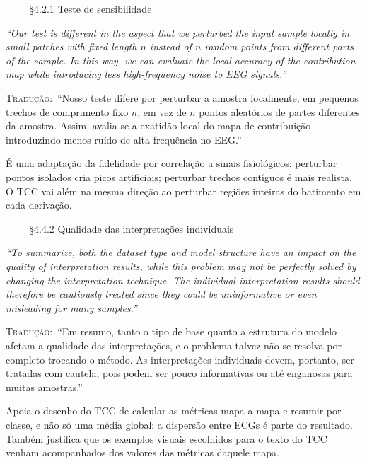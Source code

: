\documentclass[11pt,a4paper]{article}
\newcommand{\pagechip}[1]{{\setlength{\fboxsep}{1.5pt}\colorbox{cAcc}{\textcolor{white}{\scriptsize\texttt{#1}}}}}
\newenvironment{origquote}{\par\itshape\small}{\par}
\newenvironment{tradquote}{\par\small\textsc{Tradução:}\ }{\par}
\newcommand{\explab}[1]{\par\smallskip{\small\color{cAcc}\textbf{\MakeUppercase{#1}}}\par}
\begin{document}
\begin{citacard}{\pagechip{p. 5} §4.2.1 Teste de sensibilidade}
\begin{origquote}“Our test is different in the aspect that we perturbed the input sample locally in small patches with fixed length $n$ instead of $n$ random points from different parts of the sample. In this way, we can evaluate the local accuracy of the contribution map while introducing less high-frequency noise to EEG signals.”\end{origquote}
\begin{tradquote}“Nosso teste difere por perturbar a amostra localmente, em pequenos trechos de comprimento fixo $n$, em vez de $n$ pontos aleatórios de partes diferentes da amostra. Assim, avalia-se a exatidão local do mapa de contribuição introduzindo menos ruído de alta frequência no EEG.”\end{tradquote}
\explab{Explicação}
É uma adaptação da fidelidade por correlação a sinais fisiológicos: perturbar pontos isolados cria picos artificiais; perturbar trechos contíguos é mais realista. O TCC vai além na mesma direção ao perturbar regiões inteiras do batimento em cada derivação.
\end{citacard}

\begin{citacard}{\pagechip{p. 6} §4.4.2 Qualidade das interpretações individuais}
\begin{origquote}“To summarize, both the dataset type and model structure have an impact on the quality of interpretation results, while this problem may not be perfectly solved by changing the interpretation technique. The individual interpretation results should therefore be cautiously treated since they could be uninformative or even misleading for many samples.”\end{origquote}
\begin{tradquote}“Em resumo, tanto o tipo de base quanto a estrutura do modelo afetam a qualidade das interpretações, e o problema talvez não se resolva por completo trocando o método. As interpretações individuais devem, portanto, ser tratadas com cautela, pois podem ser pouco informativas ou até enganosas para muitas amostras.”\end{tradquote}
\explab{Explicação}
Apoia o desenho do TCC de calcular as métricas mapa a mapa e resumir por classe, e não só uma média global: a dispersão entre ECGs é parte do resultado. Também justifica que os exemplos visuais escolhidos para o texto do TCC venham acompanhados dos valores das métricas daquele mapa.
\end{citacard}
\end{document}
